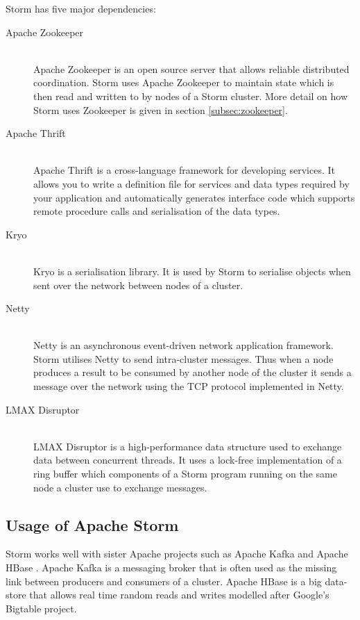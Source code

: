 Storm has five major dependencies:

\begin{description}
	\item[Apache Zookeeper] \hfill \\
	Apache Zookeeper \citep{ApacheZookeeper} is an open source server that allows reliable distributed coordination. Storm uses Apache Zookeeper to maintain state which is then read and written to by nodes of a Storm cluster. More detail on how Storm uses Zookeeper is given in section \ref{subsec:zookeeper}.
	\item[Apache Thrift] \hfill \\
	Apache Thrift \citep{ApacheThrift} is a cross-language framework for developing services. It allows you to write a definition file for services and data types required by your application and automatically generates interface code which supports remote procedure calls and serialisation of the data types.
	\item[Kryo] \hfill \\
	Kryo \citep{EsotericKryo} is a serialisation library. It is used by Storm to serialise objects when sent over the network between nodes of a cluster.
	\item[Netty] \hfill \\
	Netty \citep{Netty} is an asynchronous event-driven network application framework. Storm utilises Netty to send intra-cluster messages. Thus when a node produces a result to be consumed by another node of the cluster it sends a message over the network using the TCP protocol implemented in Netty.
	\item[LMAX Disruptor] \hfill \\
	LMAX Disruptor \cite{LMAXDisruptor} is a high-performance data structure used to exchange data between concurrent threads. It uses a lock-free implementation of a ring buffer which components of a Storm program running on the same node a cluster use to exchange messages.
\end{description}

\subsection{Usage of Apache Storm}

Storm works well with sister Apache projects such as Apache Kafka \cite{ApacheKafka} and Apache HBase \cite{ApacheHBase}. Apache Kafka is a messaging broker that is often used as the missing link between producers and consumers of a cluster. Apache HBase is a big data-store that allows real time random reads and writes modelled after Google's Bigtable project. \cite{Bigtable}

